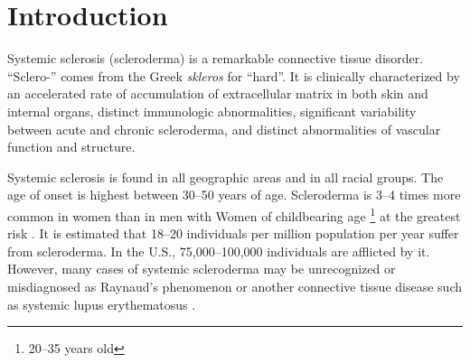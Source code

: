 \section{Introduction}

Systemic sclerosis (scleroderma) is a remarkable connective tissue disorder.
``Sclero-'' comes from the Greek \emph{skleros} for ``hard''. It is clinically
characterized by an accelerated rate of accumulation of extracellular matrix
in both skin and internal organs, distinct immunologic abnormalities,
significant variability between acute and chronic scleroderma, and distinct
abnormalities of vascular function and structure.

Systemic sclerosis is found in all geographic areas and in all racial groups.
The age of onset is highest between 30--50 years of age. Scleroderma is 3--4
times more common in women than in men with Women of childbearing age
\footnote{20--35 years old} at the greatest risk \citep[1212]{kelley}.  It is
estimated that 18--20 individuals per million population per year suffer from
scleroderma. In the U.S., 75,000--100,000 individuals are afflicted by it.
However, many cases of systemic scleroderma may be unrecognized or
misdiagnosed as Raynaud's phenomenon or another connective tissue disease such
as systemic lupus erythematosus \citep[1212]{kelley}.

